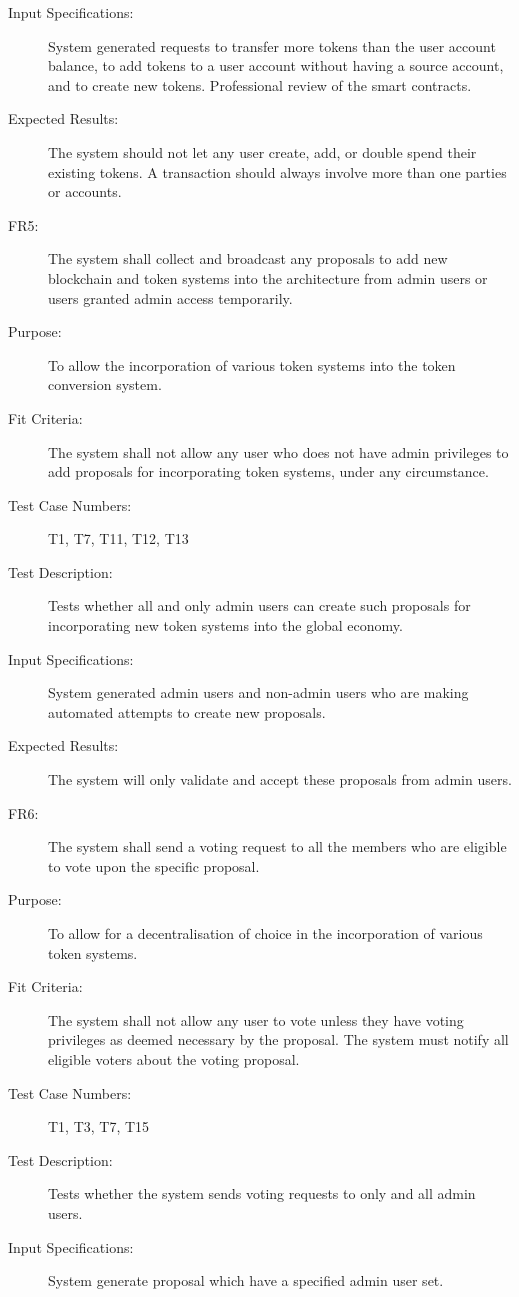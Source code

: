 \documentclass[a4paper,twoside,phd]{BYUPhys}
\begin{document}
\begin{description}
\item[Input Specifications:] System generated requests to transfer more tokens than the user account balance, to add tokens to a user account without having a source account, and to create new tokens. Professional review of the smart contracts.
\item[Expected Results:] The system should not let any user create, add, or double spend their existing tokens. A transaction should always involve more than one parties or accounts.
\\
\item[FR5:] The system shall collect and broadcast any proposals to add new blockchain and token systems into the architecture from admin users or users granted admin access temporarily.
\item[Purpose:] To allow the incorporation of various token systems into the token conversion system.
\item[Fit Criteria:] The system shall not allow any user who does not have admin privileges to add proposals for incorporating token systems, under any circumstance.
\item[Test Case Numbers:] T1, T7, T11, T12, T13
\item[Test Description:] Tests whether all and only admin users can create such proposals for incorporating new token systems into the global economy.
\item[Input Specifications:] System generated admin users and non-admin users who are making automated attempts to create new proposals.
\item[Expected Results:] The system will only validate and accept these proposals from admin users.
\\
\item[FR6:] The system shall send a voting request to all the members who are eligible to vote upon the specific proposal.
\item[Purpose:] To allow for a decentralisation of choice in the incorporation of various token systems.
\item[Fit Criteria:] The system shall not allow any user to vote unless they have voting privileges as deemed necessary by the proposal. The system must notify all eligible voters about the voting proposal.
\item[Test Case Numbers:] T1, T3, T7, T15
\item[Test Description:] Tests whether the system sends voting requests to only and all admin users.
\item[Input Specifications:] System generate proposal which have a specified admin user set. 

\end{description}
\end{document}
